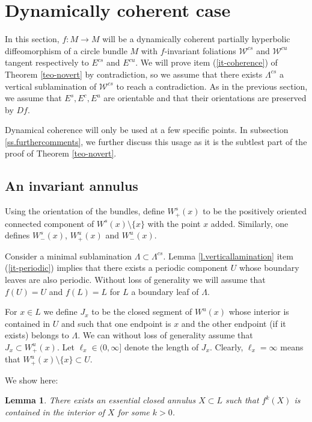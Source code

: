 \documentclass[11pt]{amsart} %
\newcommand{\Es}{E^s}
\newcommand{\Ec}{E^c}
\newcommand{\Eu}{E^u}
\newcommand{\Ecu}{E^{cu}}
\newcommand{\Ecs}{E^{cs}}
\newcommand{\cW}{\mathcal{W}}
\newcommand{\Ws}{W^s}
\newcommand{\Wu}{W^u}
\numberwithin{equation}{section}
\newtheorem{lemma}[equation]{Lemma}
\theoremstyle{remark}
\begin{document}
%
%
%


%
\section{Dynamically coherent case}\label{sec-coherent} 

In this section, $f: M \to M$ will be a dynamically coherent partially hyperbolic diffeomorphism of a circle bundle $M$ with $f$-invariant foliations $\cW^{cs}$ and $\cW^{cu}$ tangent respectively to $\Ecs$ and $\Ecu$. We will prove item (\ref{it-coherence}) of Theorem \ref{teo-novert} by contradiction, so we assume that there exists $\Lambda^{cs}$ a vertical sublamination of $\cW^{cs}$ to reach a contradiction. As in the previous section, we assume that $\Es,\Ec,\Eu$ are orientable and that their orientations are preserved by $Df$. 

Dynamical coherence will only be used at a few specific points.
In subsection \ref{ss.furthercomments}, we further discuss this usage as it is the subtlest part of the proof of Theorem \ref{teo-novert}. 
 
%
%
\subsection{An invariant annulus}\label{ss.invariantanuli}

Using the orientation of the bundles, define $\Ws_+(x)$ to be the positively oriented connected component of $\Ws(x)\setminus \{x\}$ with the point $x$ added. Similarly, one defines $\Ws_-(x)$, $\Wu_+(x)$ and $\Wu_-(x)$. 

Consider a minimal sublamination $\Lambda \subset \Lambda^{cs}$.  Lemma \ref{l.verticallamination} item (\ref{it-periodic}) implies that there exists a periodic component $U$ whose boundary leaves are also periodic. Without loss of generality we will assume that $f(U)=U$ and $f(L) = L$ for $L$ a boundary leaf of $\Lambda$. 

For $x \in L$ we define $J_x$ to be the closed segment of $\Wu(x)$
whose interior is contained in $U$ and such that one endpoint is $x$
and the other endpoint (if it exists)
belongs to $\Lambda$.
We can without loss of generality assume that $J_x \subset \Wu_+(x)$.
Let $\ell_x \in (0,\infty]$ denote the length of $J_x$. Clearly, $\ell_x = \infty$ means that $\Wu_+(x) \setminus \{x\} \subset U$. 

We show here: 

\begin{lemma}\label{lema-anulus}
There exists an essential closed annulus $X \subset L$ such that $f^k(X)$ is contained in the interior of $X$ for some $k>0$.
\end{lemma}
\end{document}
